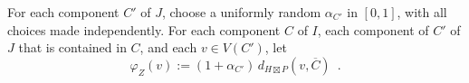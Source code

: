 \documentclass{patmorin}
\renewcommand{\ge}{\geqslant}
\begin{document}
%
%
%


For each component $C'$ of $J$, choose a uniformly random $\alpha_{C'}$ in $[0,1]$, with all choices made independently.
For each component $C$ of $I$, each component of $C'$ of $J$ that is contained in $C$, and each $v \in V(C')$, let
\[
  \varphi_{Z}(v):=(1+\alpha_{C'})\,d_{H\boxtimes P}(v,\overline{C}) \enspace .
\]
\end{document}
